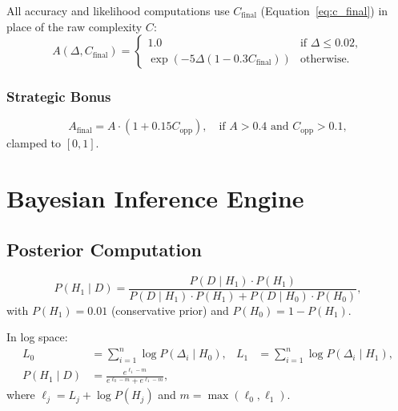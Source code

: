 \documentclass[11pt,a4paper]{article}
\begin{document}
All accuracy and likelihood computations use $C_{\text{final}}$
(Equation~\eqref{eq:c_final}) in place of the raw complexity $C$:
\begin{equation}
    A(\Delta, C_{\text{final}}) = \begin{cases}
        1.0 & \text{if } \Delta \leq 0.02, \\
        \exp\!\left(-5 \Delta (1 - 0.3 C_{\text{final}})\right) &
        \text{otherwise.}
    \end{cases}
\end{equation}

\subsubsection{Strategic Bonus}

\begin{equation}
    A_{\text{final}} = A \cdot (1 + 0.15 C_{\text{opp}}),
    \quad \text{if } A > 0.4 \text{ and } C_{\text{opp}} > 0.1,
\end{equation}
clamped to $[0, 1]$.


\section{Bayesian Inference Engine}
\label{sec:bayesian}

\subsection{Posterior Computation}

\begin{equation}
    P(H_1 \mid D) = \frac{P(D \mid H_1) \cdot P(H_1)}{P(D \mid H_1) \cdot
    P(H_1) + P(D \mid H_0) \cdot P(H_0)},
    \label{eq:bayes}
\end{equation}
with $P(H_1) = 0.01$ (conservative prior) and $P(H_0) = 1 - P(H_1)$.

In log space:
\begin{align}
    L_0 &= \sum_{i=1}^{n} \log P(\Delta_i \mid H_0), &
    L_1 &= \sum_{i=1}^{n} \log P(\Delta_i \mid H_1),\\
    P(H_1 \mid D) &= \frac{e^{\ell_1 - m}}{e^{\ell_0 - m} + e^{\ell_1 - m}},
\end{align}
where $\ell_j = L_j + \log P(H_j)$ and $m = \max(\ell_0, \ell_1)$.
\end{document}
